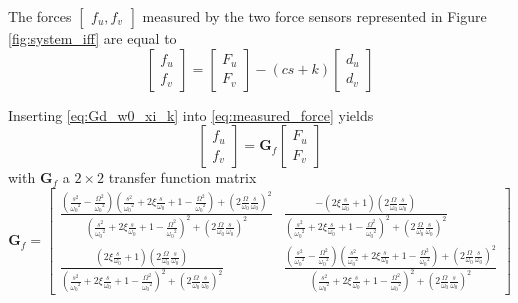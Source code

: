 \documentclass{ISMA_USD2020}
\begin{document}
\par
The forces \(\begin{bmatrix}f_u, f_v\end{bmatrix}\) measured by the two force sensors represented in Figure \ref{fig:system_iff} are equal to
\begin{equation}
\label{eq:measured_force}
  \begin{bmatrix} f_{u} \\ f_{v} \end{bmatrix} =
  \begin{bmatrix} F_u \\ F_v \end{bmatrix} - (c s + k)
  \begin{bmatrix} d_u \\ d_v \end{bmatrix}
\end{equation}

Inserting \eqref{eq:Gd_w0_xi_k} into \eqref{eq:measured_force} yields
\begin{equation}
\label{eq:Gf_mimo_tf}
  \begin{bmatrix} f_{u} \\ f_{v} \end{bmatrix} = \bm{G}_{f} \begin{bmatrix} F_u \\ F_v \end{bmatrix}
\end{equation}
with \(\bm{G}_f\) a \(2 \times 2\) transfer function matrix
\begin{equation}
\label{eq:Gf}
  \bm{G}_{f} = \begin{bmatrix}
  \frac{\left( \frac{s^2}{{\omega_0}^2} - \frac{\Omega^2}{{\omega_0}^2} \right) \left( \frac{s^2}{{\omega_0}^2} + 2 \xi \frac{s}{\omega_0} + 1 - \frac{{\Omega}^2}{{\omega_0}^2} \right) + \left( 2 \frac{\Omega}{\omega_0} \frac{s}{\omega_0} \right)^2}{\left( \frac{s^2}{{\omega_0}^2} + 2 \xi \frac{s}{\omega_0} + 1 - \frac{{\Omega}^2}{{\omega_0}^2} \right)^2 + \left( 2 \frac{\Omega}{\omega_0} \frac{s}{\omega_0} \right)^2} & \frac{- \left( 2 \xi \frac{s}{\omega_0} + 1 \right) \left( 2 \frac{\Omega}{\omega_0} \frac{s}{\omega_0} \right)}{\left( \frac{s^2}{{\omega_0}^2} + 2 \xi \frac{s}{\omega_0} + 1 - \frac{{\Omega}^2}{{\omega_0}^2} \right)^2 + \left( 2 \frac{\Omega}{\omega_0} \frac{s}{\omega_0} \right)^2} \\
  \frac{\left( 2 \xi \frac{s}{\omega_0} + 1 \right) \left( 2 \frac{\Omega}{\omega_0} \frac{s}{\omega_0} \right)}{\left( \frac{s^2}{{\omega_0}^2} + 2 \xi \frac{s}{\omega_0} + 1 - \frac{{\Omega}^2}{{\omega_0}^2} \right)^2 + \left( 2 \frac{\Omega}{\omega_0} \frac{s}{\omega_0} \right)^2} & \frac{\left( \frac{s^2}{{\omega_0}^2} - \frac{\Omega^2}{{\omega_0}^2} \right) \left( \frac{s^2}{{\omega_0}^2} + 2 \xi \frac{s}{\omega_0} + 1 - \frac{{\Omega}^2}{{\omega_0}^2} \right) + \left( 2 \frac{\Omega}{\omega_0} \frac{s}{\omega_0} \right)^2}{\left( \frac{s^2}{{\omega_0}^2} + 2 \xi \frac{s}{\omega_0} + 1 - \frac{{\Omega}^2}{{\omega_0}^2} \right)^2 + \left( 2 \frac{\Omega}{\omega_0} \frac{s}{\omega_0} \right)^2}
\end{bmatrix}
\end{equation}
\end{document}
